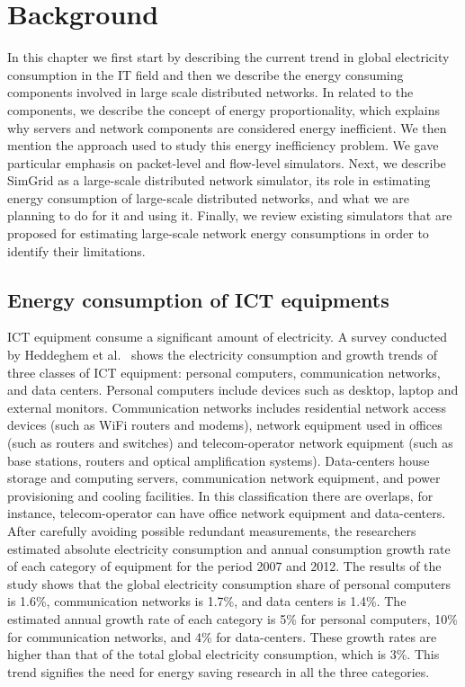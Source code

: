 \chapter{Background}
\label{chapter:background} 
In this chapter we first start by describing the current trend in global electricity consumption in the IT field and then we describe the energy consuming components involved in large scale distributed networks. In related to the components, we describe the concept of energy proportionality, which explains why servers and network components are considered energy inefficient. We then mention the approach used to study this energy inefficiency problem. We gave particular emphasis on packet-level and flow-level simulators. Next, we describe SimGrid as a large-scale distributed network simulator, its role in estimating energy consumption of large-scale distributed networks, and what we are planning to do for it and using it. Finally, we review existing simulators that are proposed for estimating large-scale network energy consumptions in order to identify their limitations.
\section{Energy consumption of ICT equipments}
\label{section:ictequipment}
ICT equipment consume a significant amount of electricity. A survey conducted by Heddeghem et al.~\cite{DBLP:journals/comcom/HeddeghemLLCPD14} shows the electricity consumption and growth trends of three classes of ICT equipment: personal computers, communication networks, and data centers. Personal computers include devices such as desktop, laptop and external monitors. Communication networks includes residential network access devices (such as WiFi routers and modems), network equipment used in offices (such as routers and switches) and telecom-operator network equipment (such as base stations, routers and optical amplification systems). Data-centers house storage and computing servers, communication network equipment, and power provisioning and cooling facilities.  In this classification there are overlaps, for instance, telecom-operator can have office network equipment and data-centers. After carefully avoiding possible redundant measurements, the researchers estimated absolute electricity consumption and annual consumption growth rate of each category of equipment for the period 2007 and 2012. The results of the study shows that the global electricity consumption share of personal computers is 1.6\%, communication networks is 1.7\%, and data centers is 1.4\%. The estimated annual growth rate of each category is 5\% for personal computers, 10\% for communication networks, and 4\% for data-centers. These growth rates are higher than that of the total global electricity consumption, which is 3\%. This trend signifies the need for energy saving research in all the three categories.
